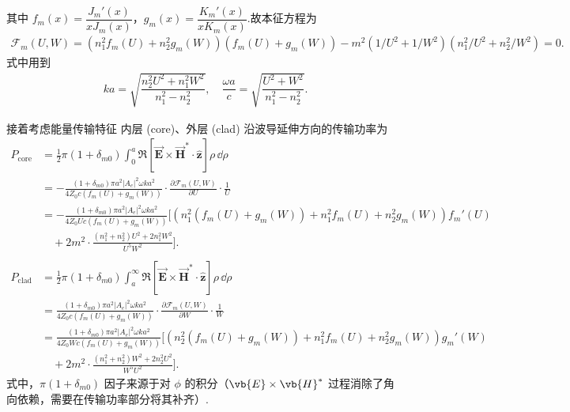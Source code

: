 其中 \( f_m(x) = \dfrac{J_m'(x)}{x J_m(x)} \)，\( g_m(x) = \dfrac{K_m'(x)}{x K_m(x)} \).故本征方程为
\begin{align*}
	\mathcal{F}_m(U, W) = \left( n_1^2 f_m(U) + n_2^2 g_m(W) \right) \left( f_m(U) + g_m(W) \right) - m^2 \left( 1/U^2 + 1/W^2 \right) \left( n_1^2/U^2 + n_2^2/W^2 \right) = 0.
\end{align*}
式中用到
\begin{align*}
	ka = \sqrt{\dfrac{n_2^2 U^2 + n_1^2 W^2}{n_1^2 - n_2^2}}, \quad \dfrac{\omega a}{c} = \sqrt{\dfrac{U^2 + W^2}{n_1^2 - n_2^2}}.
\end{align*}

接着考虑能量传输特征
内层 (core)、外层 (clad) 沿波导延伸方向的传输功率为
{\small
\begin{equation*}
	\begin{split}
		P_{\text{core}} & = \frac{1}{2} \pi (1 + \delta_{m0}) \int_0^a \Re\left[ \vec{\mathbf{E}} \times \vec{\mathbf{H}}^* \cdot \hat{\mathbf{z}} \right] \rho \, \dd \rho                          \\
		                & = -\frac{(1 + \delta_{m0}) \pi a^2 |A_e|^2 \omega k a^2}{4 Z_0 c (f_m(U) + g_m(W))} \cdot \frac{\partial \mathcal{F}_m(U, W)}{\partial U} \cdot \frac{1}{U}               \\
		                & = -\frac{(1 + \delta_{m0}) \pi a^2 |A_e|^2 \omega k a^2}{4 Z_0 U c (f_m(U) + g_m(W))} \Bigg[ \left( n_1^2 (f_m(U) + g_m(W)) + n_1^2 f_m(U) + n_2^2 g_m(W) \right) f_m'(U) \\
		                & \quad + 2 m^2 \cdot \frac{(n_1^2 + n_2^2) U^2 + 2 n_1^2 W^2}{U^5 W^2} \Bigg].                                                                                             \\
		\\
		P_{\text{clad}} & = \frac{1}{2} \pi (1 + \delta_{m0}) \int_a^\infty \Re\left[ \vec{\mathbf{E}} \times \vec{\mathbf{H}}^* \cdot \hat{\mathbf{z}} \right] \rho \, \dd \rho                     \\
		                & = \frac{(1 + \delta_{m0}) \pi a^2 |A_e|^2 \omega k a^2}{4 Z_0 c (f_m(U) + g_m(W))} \cdot \frac{\partial \mathcal{F}_m(U, W)}{\partial W} \cdot \frac{1}{W}                \\
		                & = \frac{(1 + \delta_{m0}) \pi a^2 |A_e|^2 \omega k a^2}{4 Z_0 W c (f_m(U) + g_m(W))} \Bigg[ \left( n_2^2 (f_m(U) + g_m(W)) + n_1^2 f_m(U) + n_2^2 g_m(W) \right)g_m'(W)   \\
		                & \quad + 2 m^2 \cdot \frac{(n_1^2 + n_2^2) W^2 + 2 n_2^2 U^2}{W^5 U^2} \Bigg].
	\end{split}
\end{equation*}
}
式中，\(\pi (1 + \delta_{m0})\) 因子来源于对 \(\phi\) 的积分（\(\vb{E} \times \vb{H}^*\) 过程消除了角向依赖，需要在传输功率部分将其补齐）.

